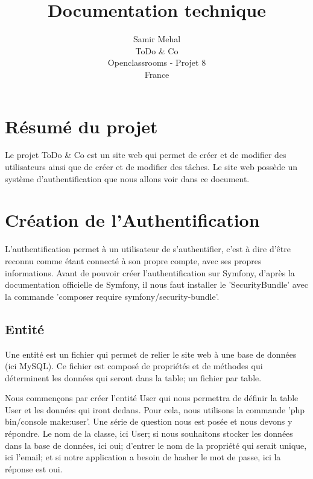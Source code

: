 \documentclass{article}
\title{Documentation technique}
\author{Samir Mehal\\
  \small ToDo \& Co\\
  \small Openclassrooms - Projet 8\\
  \small France
}
\theoremstyle{definition}
\theoremstyle{remark}
\begin{document}
\maketitle


\newpage

\tableofcontents

\newpage




\section{Résumé du projet}

Le projet ToDo \& Co est un site web qui permet de créer et de modifier des utilisateurs ainsi que de créer et de modifier des tâches. Le site web possède un système d'authentification que nous allons voir dans ce document.

\section{Création de l'Authentification}

L'authentification permet à un utilisateur de s'authentifier, c'est à dire d'être reconnu comme étant connecté à son propre compte, avec ses propres informations. Avant de pouvoir créer l'authentification sur Symfony, d'après la documentation officielle de Symfony, il nous faut installer le 'SecurityBundle' avec la commande 'composer require symfony/security-bundle'.

\subsection{Entité}

Une entité est un fichier qui permet de relier le site web à une base de données (ici MySQL). Ce fichier est composé de propriétés et de méthodes qui déterminent les données qui seront dans la table; un fichier par table.

Nous commençons par créer l'entité User qui nous permettra de définir la table User et les données qui iront dedans. Pour cela, nous utilisons la commande 'php bin/console make:user'. Une série de question nous est posée et nous devons y répondre. Le nom de la classe, ici User; si nous souhaitons stocker les données dans la base de données, ici oui; d'entrer le nom de la propriété qui serait unique, ici l'email; et si notre application a besoin de hasher le mot de passe, ici la réponse est oui.
\end{document}
